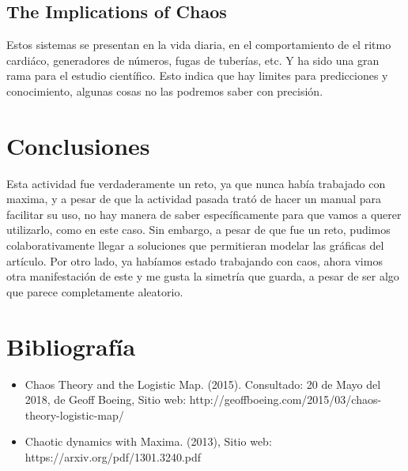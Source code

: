\documentclass[12pt]{article}
\begin{document}
\subsection{The Implications of Chaos}

Estos sistemas se presentan en la vida diaria, en el comportamiento de el ritmo cardiáco, generadores de números, fugas de tuberías, etc. Y ha sido una gran rama para el estudio científico. Esto indica que hay limites para predicciones y conocimiento, algunas cosas no las podremos saber con precisión. 

\section{Conclusiones}

Esta actividad fue verdaderamente un reto, ya que nunca había trabajado con maxima, y a pesar de que la actividad pasada trató de hacer un manual para facilitar su uso, no hay manera de saber específicamente para que vamos a querer utilizarlo, como en este caso. Sin embargo, a pesar de que fue un reto, pudimos colaborativamente llegar a soluciones que permitieran modelar las gráficas del artículo. Por otro lado, ya habíamos estado trabajando con caos, ahora vimos otra manifestación de este y me gusta la simetría que guarda, a pesar de ser algo que parece completamente aleatorio.

\section{Bibliografía}

\begin{itemize}
\item Chaos Theory and the Logistic Map. (2015). Consultado: 20 de Mayo del 2018, de Geoff Boeing, Sitio web: http://geoffboeing.com/2015/03/chaos-theory-logistic-map/
\item Chaotic dynamics with Maxima. (2013), Sitio web: https://arxiv.org/pdf/1301.3240.pdf
\end{itemize}
\end{document}
